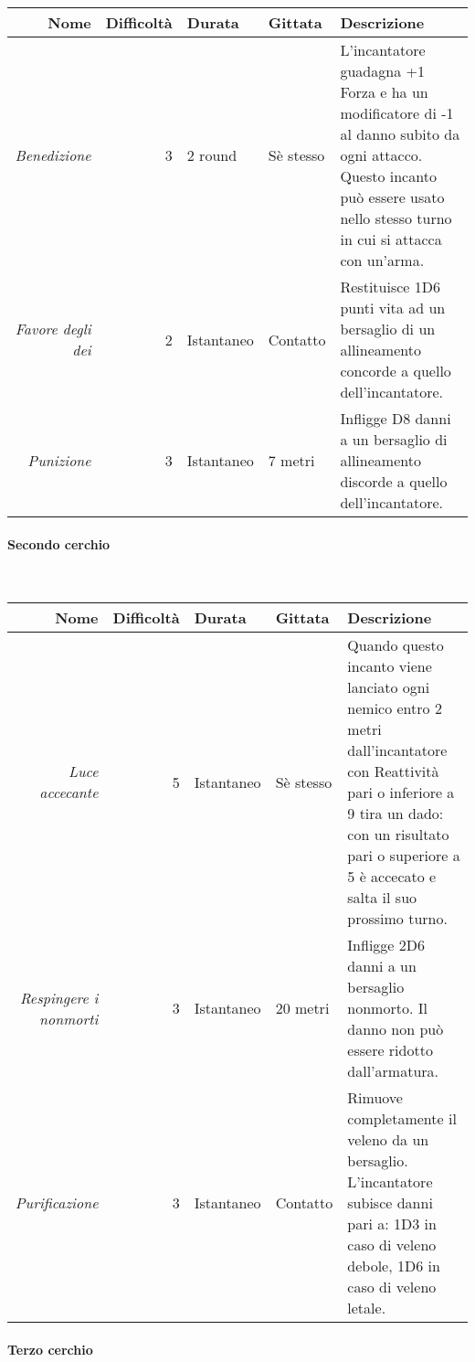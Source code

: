 \documentclass[../manuale_main.tex]{subfiles}
\begin{document}
\begin{tabularx}{\linewidth}{|N| D| T| G| Y|}
\hline
\textbf{Nome} & \textbf{Difficoltà} & \textbf{Durata} & \textbf{Gittata} & \textbf{Descrizione} \\ \hline\hline
\textit{Benedizione} & 3 & 2 round & Sè stesso &L'incantatore guadagna +1 Forza e ha un modificatore di -1 al danno subito da ogni attacco. Questo incanto può essere usato nello stesso turno in cui si attacca con un'arma. \\ \hline
\textit{Favore degli dei} & 2 &Istantaneo  & Contatto  & Restituisce 1D6 punti vita ad un bersaglio di un allineamento concorde a quello dell'incantatore.\\ \hline
\textit{Punizione} & 3 & Istantaneo & 7 metri &Infligge D8 danni a un bersaglio di allineamento discorde a quello dell'incantatore. \\ 
\hline
\end{tabularx}

\paragraph{Secondo cerchio}\mbox{}\\

\begin{tabularx}{\linewidth}{|N| D| T| G| Y|}
\hline
\textbf{Nome} & \textbf{Difficoltà} & \textbf{Durata} & \textbf{Gittata} & \textbf{Descrizione} \\ \hline\hline
\textit{Luce accecante} & 5 & Istantaneo & Sè stesso & Quando questo incanto viene lanciato ogni nemico entro 2 metri dall'incantatore con Reattività pari o inferiore a 9 tira un dado: con un risultato pari o superiore a 5 è accecato e salta il suo prossimo turno. \\ \hline
\textit{Respingere i nonmorti} & 3 &Istantaneo  & 20 metri  & Infligge 2D6 danni a un bersaglio nonmorto. Il danno non può essere ridotto dall'armatura.\\ \hline
\textit{Purificazione} & 3 & Istantaneo & Contatto &Rimuove completamente il veleno da un bersaglio. L'incantatore subisce danni pari a: 1D3 in caso di veleno debole, 1D6 in caso di veleno letale. \\ 
\hline
\end{tabularx}

\clearpage
\paragraph{Terzo cerchio}\mbox{}\\
\end{document}
